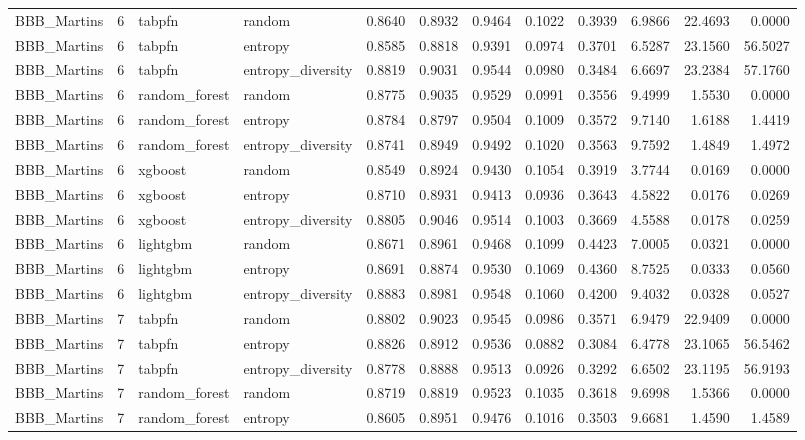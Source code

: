 \begin{tabular}{lrllrrrrrrrr}
BBB_Martins & 6 & tabpfn & random & 0.8640 & 0.8932 & 0.9464 & 0.1022 & 0.3939 & 6.9866 & 22.4693 & 0.0000 \\
BBB_Martins & 6 & tabpfn & entropy & 0.8585 & 0.8818 & 0.9391 & 0.0974 & 0.3701 & 6.5287 & 23.1560 & 56.5027 \\
BBB_Martins & 6 & tabpfn & entropy_diversity & 0.8819 & 0.9031 & 0.9544 & 0.0980 & 0.3484 & 6.6697 & 23.2384 & 57.1760 \\
BBB_Martins & 6 & random_forest & random & 0.8775 & 0.9035 & 0.9529 & 0.0991 & 0.3556 & 9.4999 & 1.5530 & 0.0000 \\
BBB_Martins & 6 & random_forest & entropy & 0.8784 & 0.8797 & 0.9504 & 0.1009 & 0.3572 & 9.7140 & 1.6188 & 1.4419 \\
BBB_Martins & 6 & random_forest & entropy_diversity & 0.8741 & 0.8949 & 0.9492 & 0.1020 & 0.3563 & 9.7592 & 1.4849 & 1.4972 \\
BBB_Martins & 6 & xgboost & random & 0.8549 & 0.8924 & 0.9430 & 0.1054 & 0.3919 & 3.7744 & 0.0169 & 0.0000 \\
BBB_Martins & 6 & xgboost & entropy & 0.8710 & 0.8931 & 0.9413 & 0.0936 & 0.3643 & 4.5822 & 0.0176 & 0.0269 \\
BBB_Martins & 6 & xgboost & entropy_diversity & 0.8805 & 0.9046 & 0.9514 & 0.1003 & 0.3669 & 4.5588 & 0.0178 & 0.0259 \\
BBB_Martins & 6 & lightgbm & random & 0.8671 & 0.8961 & 0.9468 & 0.1099 & 0.4423 & 7.0005 & 0.0321 & 0.0000 \\
BBB_Martins & 6 & lightgbm & entropy & 0.8691 & 0.8874 & 0.9530 & 0.1069 & 0.4360 & 8.7525 & 0.0333 & 0.0560 \\
BBB_Martins & 6 & lightgbm & entropy_diversity & 0.8883 & 0.8981 & 0.9548 & 0.1060 & 0.4200 & 9.4032 & 0.0328 & 0.0527 \\
BBB_Martins & 7 & tabpfn & random & 0.8802 & 0.9023 & 0.9545 & 0.0986 & 0.3571 & 6.9479 & 22.9409 & 0.0000 \\
BBB_Martins & 7 & tabpfn & entropy & 0.8826 & 0.8912 & 0.9536 & 0.0882 & 0.3084 & 6.4778 & 23.1065 & 56.5462 \\
BBB_Martins & 7 & tabpfn & entropy_diversity & 0.8778 & 0.8888 & 0.9513 & 0.0926 & 0.3292 & 6.6502 & 23.1195 & 56.9193 \\
BBB_Martins & 7 & random_forest & random & 0.8719 & 0.8819 & 0.9523 & 0.1035 & 0.3618 & 9.6998 & 1.5366 & 0.0000 \\
BBB_Martins & 7 & random_forest & entropy & 0.8605 & 0.8951 & 0.9476 & 0.1016 & 0.3503 & 9.6681 & 1.4590 & 1.4589 \\

\end{tabular}

